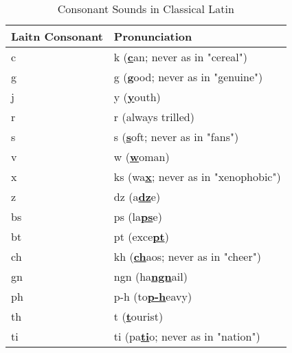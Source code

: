 \begin{table}[H]
	\centering

	\begin{tabular}{|l|l|}
		\hline
		\textbf{Laitn Consonant} & \textbf{Pronunciation}                                  \\
		\hline
		c                        & k (\textbf{\underline{c}}an; never as in "cereal")      \\
		g                        & g (\textbf{\underline{g}}ood; never as in "genuine")    \\
		j                        & y (\textbf{\underline{y}}outh)                          \\
		r                        & r (always trilled)                                      \\
		s                        & s (\textbf{\underline{s}}oft; never as in "fans")       \\
		v                        & w (\textbf{\underline{w}}oman)                          \\
		x                        & ks (wa\textbf{\underline{x}}; never as in "xenophobic") \\
		z                        & dz (a\textbf{\underline{dz}}e)                          \\
		bs                       & ps (la\textbf{\underline{ps}}e)                         \\
		bt                       & pt (exce\textbf{\underline{pt}})                        \\
		ch                       & kh (\textbf{\underline{ch}}aos; never as in "cheer")    \\
		gn                       & ngn (ha\textbf{\underline{ngn}}ail)                     \\
		ph                       & p-h (to\textbf{\underline{p-h}}eavy)                    \\
		th                       & t (\textbf{\underline{t}}ourist)                        \\
		ti                       & ti (pa\textbf{\underline{ti}}o; never as in "nation")   \\
		\hline
	\end{tabular}

	\caption{Consonant Sounds in Classical Latin}
	\label{tab:consonant_sounds_in_classical_latin}
\end{table}


